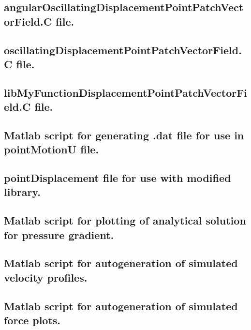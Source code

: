 \subsection{angularOscillatingDisplacementPointPatchVectorField.C file.}
\subsection{oscillatingDisplacementPointPatchVectorField.C file.}
\subsection{libMyFunctionDisplacementPointPatchVectorField.C file.}

\subsection{Matlab script for generating .dat file for use in pointMotionU file.}
\subsection{pointDisplacement file for use with modified library.}
\subsection{Matlab script for plotting of analytical solution for pressure gradient.}
\subsection{Matlab script for autogeneration of simulated velocity profiles.}
\subsection{Matlab script for autogeneration of simulated force plots.}